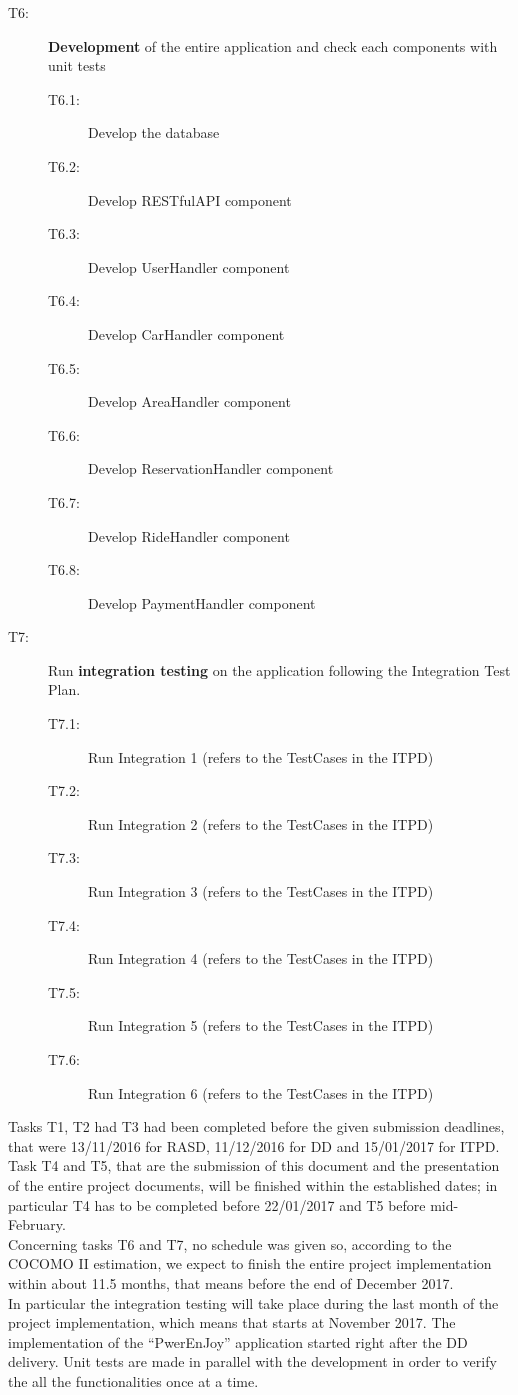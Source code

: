 \begin{description}
	\item[T6:] \textbf{Development} of the entire application and check each components with unit tests
	\begin{description}
		\item[T6.1:] Develop the database
		\item[T6.2:] Develop RESTfulAPI component
		\item[T6.3:] Develop UserHandler component
		\item[T6.4:] Develop CarHandler component
		\item[T6.5:] Develop AreaHandler component
		\item[T6.6:] Develop ReservationHandler component
		\item[T6.7:] Develop RideHandler component
		\item[T6.8:] Develop PaymentHandler component
	\end{description}
	
	\item[T7:] Run \textbf{integration testing} on the application following the Integration Test Plan.
	\begin{description}
		\item[T7.1:] Run Integration 1 (refers to the TestCases in the ITPD)
		\item[T7.2:] Run Integration 2 (refers to the TestCases in the ITPD)
		\item[T7.3:] Run Integration 3 (refers to the TestCases in the ITPD)
		\item[T7.4:] Run Integration 4 (refers to the TestCases in the ITPD)
		\item[T7.5:] Run Integration 5 (refers to the TestCases in the ITPD)
		\item[T7.6:] Run Integration 6 (refers to the TestCases in the ITPD)
	\end{description}
	
\end{description}
Tasks T1, T2 had T3 had been completed before the given submission deadlines, that were 13/11/2016 for RASD, 11/12/2016 for DD and 15/01/2017 for ITPD. \\
Task T4 and T5, that are the submission of this document and the presentation of the entire project documents, will be finished within the established dates; in particular T4 has to be completed before 22/01/2017 and T5 before mid-February. \\
Concerning tasks T6 and T7, no schedule was given so, according to the COCOMO II estimation, we expect to finish the entire project implementation within about 11.5 months, that means before the end of December 2017. \\ In particular the integration testing will take place during the last month of the project implementation, which means that starts at November 2017.
The implementation of the ``PwerEnJoy'' application started right after the DD delivery. Unit tests are made in parallel with the development in order to verify the all the functionalities once at a time. \\

